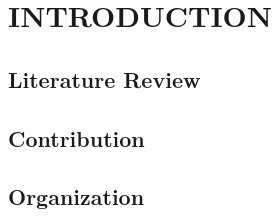 %

\chapter{INTRODUCTION}
\label{chap:intro}
\section{Literature Review}
\section{Contribution}
\section{Organization}


